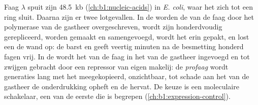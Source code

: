 \begin{proposition}\label{prop:b1:genomes:lambda}
Faag $\lambda$ spuit zijn \qty{48.5}{kb}  (\cref{ch:b1:nucleic-acids}) in
\emph{E. coli}, waar het zich tot een ring sluit. Daarna zijn er twee lotgevallen.
In de \emph{} worden de  van de faag door het polymerase van de
gastheer overgeschreven, wordt zijn  honderdvoudig gerepliceerd, worden
 gemaakt en samengevoegd, wordt het  erin gepakt, en lost een
 de wand op: de  barst en geeft veertig minuten na de besmetting honderd
fagen vrij. In de \emph{} wordt het  van de faag in het 
van de gastheer ingevoegd en tot zwijgen gebracht door een repressor van eigen
makelij: de \emph{profaag} wordt generaties lang met het  meegekopieerd,
onzichtbaar, tot schade aan het  van de gastheer de onderdrukking opheft en de
 hervat. De keuze is een moleculaire schakelaar, een van de eerste
die is begrepen (\cref{ch:b1:expression-control}).
\end{proposition}

